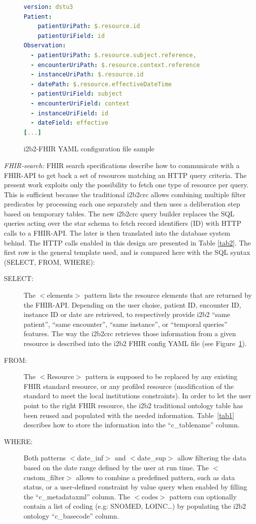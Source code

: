 \documentclass{amia}
\begin{document}
\begin{figure}

\begin{lstlisting}[language=yaml, basicstyle=\small]
version: dstu3
Patient:
    patientUriPath: $.resource.id
    patientUriField: id
Observation:
  - patientUriPath: $.resource.subject.reference,
  - encounterUriPath: $.resource.context.reference
  - instanceUriPath: $.resource.id
  - datePath: $.resource.effectiveDateTime
  - patientUriField: subject
  - encounterUriField: context
  - instanceUriField: id
  - dateField: effective
[...]
\end{lstlisting}

  \caption{i2b2-FHIR YAML configuration file sample}
	\label{conf1}
\end{figure}
\textit{FHIR-search:} FHIR search specifications\cite{FHIR} describe how to communicate with a FHIR-API to get back a set of resources matching an HTTP query criteria. The present work exploits only the possibility to fetch one type of resource per query. This is sufficient because the traditional i2b2crc allows combining multiple filter predicates by processing each one separately and then uses a deliberation step based on temporary tables. The new i2b2crc query builder replaces the SQL queries acting over the star schema to fetch record identifiers (ID) with HTTP calls to a FHIR-API. The later is then translated into the database system behind. The HTTP calls enabled in this design are presented in Table \ref{tab2}. The first row is the general template used, and is compared here with the SQL syntax (SELECT, FROM, WHERE):
\begin{description}
	\item[SELECT:] The $<$elements$>$ pattern lists the resource elements that are returned by the FHIR-API. Depending on the user choise, patient ID, encounter ID, instance ID or date are retrieved, to respectively provide i2b2 ``same patient'', ``same encounter'', ``same instance'', or ``temporal queries'' features. The way the i2b2crc retrieves those information from a given resource is described into the i2b2 FHIR config YAML file (see Figure~\ref{conf1}).
	\item[FROM:] The $<$Resource$>$ pattern is supposed to be replaced by any existing FHIR standard resource, or any profiled resource (modification of the standard to meet the local institutions constraints). In order to let the user point to the right FHIR resource, the i2b2 traditional ontology table has been reused and populated with the needed information. Table~\ref{tab1} describes how to store the information into the ``c\_tablename'' column.
	\item [WHERE:] Both patterns $<$date\_inf$>$ and $<$date\_sup$>$ allow filtering the data based on the date range defined by the user at run time. The $<$custom\_filter$>$ allows to combine a predefined pattern, such as data status, or a user-defined constraint by value query when enabled by filling the ``c\_metadataxml'' column. The $<$codes$>$ pattern can optionally contain a list of coding (e.g: SNOMED, LOINC\ldots) by populating the i2b2 ontology ``c\_basecode'' column.
\end{description}
\end{document}
